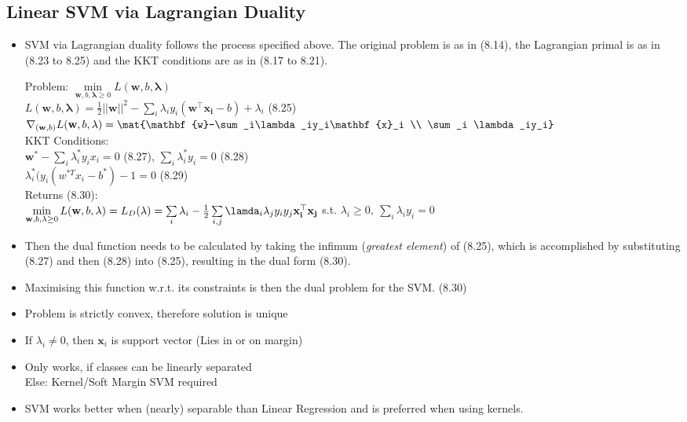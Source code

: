 \documentclass[english]{latex4ei/latex4ei_sheet}
\begin{document}
\begin{sectionbox}
\subsection{Linear SVM via Lagrangian Duality}
\begin{itemize}
\item SVM via Lagrangian duality follows the process specified above. The original problem is as in (8.14), the Lagrangian primal is as in (8.23 to 8.25) and the KKT conditions are as in (8.17 to 8.21). 
\begin{emphbox}
    Problem: $\min\limits_{\mathbf{w}, b, \mathbf{\lambda}\ge0} L(\mathbf{w}, b, \mathbf{\lambda})$ \\  $L(\mathbf{w}, b, \mathbf{\lambda})= \frac{1}{2}||\mathbf{w}||^2 - \sum\limits_i \lambda_i y_i(\mathbf{w^{\top}x_i}-b)+\lambda_i $ (8.25)\\
    		$\nabla_{(\mathbf{w},b)}L(\mathbf{w}, b, \mathbf{\lambda})=\mat{\mathbf{w}-\sum_i\lambda_iy_i\mathbf{x}_i \\ \sum_i \lambda_iy_i}$\\
    KKT Conditions:\\ $\mathbf{w^*}-\sum_i\lambda_i^*y_ix_i=0$ (8.27), \quad $\sum_i\lambda^*_iy_i=0$ (8.28)\\
    $\lambda_i^*(y_i(w^{*T}x_i-b^*)-1=0$ (8.29)\\
    Returns (8.30): \\
    $\min\limits_{\mathbf{w}, b, \mathbf{\lambda}\ge0} L(\mathbf{w}, b, \mathbf{\lambda})=L_D(\mathbf{\lambda})=
    \sum\limits_i\lambda_i-\frac{1}{2}\sum\limits_{i,j}\lamda_i\lambda_jy_iy_j\mathbf{x_i^{\top}x_j}$ s.t. $\lambda_i\ge0, \ \sum_i\lambda_iy_i=0$
\end{emphbox}

\item Then the dual function needs to be calculated by taking the infimum (\emph{greatest element}) of (8.25), which is accomplished by substituting (8.27) and then (8.28) into (8.25), resulting in the dual form (8.30).
\item Maximising this function w.r.t. its constraints is then the dual problem for the SVM. (8.30)

\item Problem is strictly convex, therefore solution is unique
\item If $\lambda_i \ne 0$, then $\mathbf{x}_i$ is support vector (Lies in or on margin)
\item Only works, if classes can be linearly separated \\
Else: Kernel/Soft Margin SVM required
\item SVM works better when (nearly) separable than Linear Regression and is preferred when using kernels.
\end{itemize}


\end{sectionbox}
\end{document}

